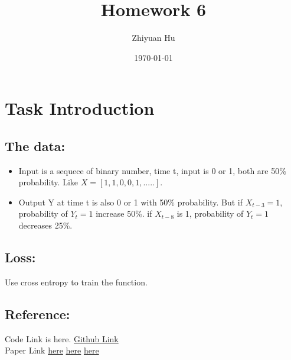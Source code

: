 \documentclass[11pt]{article}
\title{Homework 6}
\date{\today}
\author{Zhiyuan Hu}
\begin{document}
	\maketitle
	\section{Task Introduction}
	\subsection{The data:}
	\begin{itemize}
		\item Input is a sequece of binary number, time t, input is 0 or 1, both are 50\% probability. Like $X = [1,1,0,0,1,.....]$.
		\item 
		Output Y at time t is also 0 or 1 with 50\% probability. But if $X_{t-3}=1$, probability of $Y_t = 1$ increase 50\%. if $X_{t-8}$ is 1, probability of $Y_t = 1$ decreases 25\%.
	\end{itemize}
	\subsection{Loss:}
	Use cross entropy to train the function.
	\subsection{Reference:}
	Code Link is here. \href{ https://github.com/lawlite19/Blog-Back-Up/blob/master/code/rnn/rnn_implement.py}{Github Link}\\ 
	Paper Link \href{https://r2rt.com/recurrent-neural-networks-in-tensorflow-i.html}{here}
	 \href{https://r2rt.com/styles-of-truncated-backpropagation.html}{here} \href{https://web.stanford.edu/class/psych209a/ReadingsByDate/02_25/Williams%20Zipser95RecNets.pdf}{here}
\end{document}
